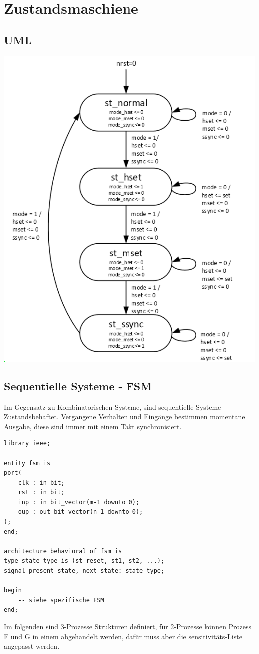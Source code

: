 \section{Zustandsmaschiene}
\subsection{UML}
\begin{center}
	\includegraphics[width=\columnwidth]{Images/zustandsmachine}
\end{center}



\subsection{Sequentielle Systeme - FSM}
Im Gegensatz zu Kombinatorischen Systeme, sind sequentielle Systeme Zustandsbehaftet. Vergangene Verhalten und Eingänge bestimmen momentane Ausgabe, diese sind immer mit einem Takt synchronisiert.
\begin{lstlisting}
library ieee;
	
entity fsm is
port(
	clk : in bit;
	rst : in bit;
	inp : in bit_vector(m-1 downto 0);
	oup : out bit_vector(n-1 downto 0);
);
end;
	
architecture behavioral of fsm is
type state_type is (st_reset, st1, st2, ...); 
signal present_state, next_state: state_type; 

begin
	-- siehe spezifische FSM
end;
\end{lstlisting}
Im folgenden sind 3-Prozesse Strukturen definiert, für 2-Prozesse können Prozess F und G in einem abgehandelt werden, dafür muss aber die sensitivitäts-Liste angepasst werden.


